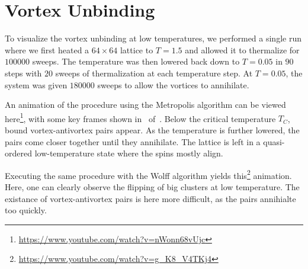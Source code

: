 \section{Vortex Unbinding}\label{sec:vortex_unbinding}
	To visualize the vortex unbinding at low temperatures, we performed a single run where we first heated a $64 \times 64$ lattice  to $T = \num{1.5}$ and allowed it to thermalize for $\num{100 000}$ sweeps. The temperature was then lowered back down to $T = \num{0.05}$ in $90$ steps with $20$ sweeps of thermalization at each temperature step. At $T = \num{0.05}$, the system was given $\num{180 000}$ sweeps to allow the vortices to annihilate.
	
	An animation of the procedure using the Metropolis algorithm can be viewed here\footnote{\url{https://www.youtube.com/watch?v=nWonn68vUjc}}, with some key frames shown in~ of~. Below the critical temperature $T_C$, bound vortex-antivortex pairs appear. As the temperature is further lowered, the pairs come closer together until they annihilate. The lattice is left in a quasi-ordered low-temperature state where the spins mostly align.
	
	Executing the same procedure with the Wolff algorithm yields this\footnote{\url{https://www.youtube.com/watch?v=g_K8_V4TKj4}} animation. Here, one can clearly observe the flipping of big clusters at low temperature. The existance of vortex-antivortex pairs is here more difficult, as the pairs annihialte too quickly. 